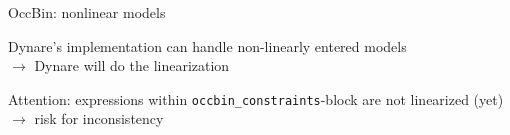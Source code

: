 \begin{frame}{OccBin: nonlinear models}
\begin{wideitemize}
\item Dynare's implementation can handle non-linearly entered models\\
$\rightarrow$ Dynare will do the linearization
\item Attention: expressions within \texttt{occbin\_constraints}-block are not linearized (yet)\\
$\rightarrow$ risk for inconsistency
\end{wideitemize}
\end{frame}

%
%
%
